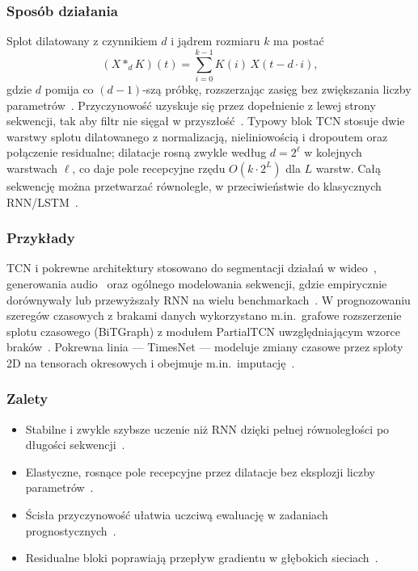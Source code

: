 \subsubsection{Sposób działania}
Splot dilatowany z czynnikiem $d$ i jądrem rozmiaru $k$ ma postać
\begin{equation}
  (X *_d K)(t) = \sum_{i=0}^{k-1} K(i)\, X(t - d\cdot i),
  \label{eq:dilated}
\end{equation}
gdzie $d$ pomija co $(d-1)$-szą próbkę, rozszerzając zasięg bez zwiększania liczby
parametrów~\citep{yu2016multi,oord2016wavenet}. Przyczynowość uzyskuje się przez
dopełnienie z lewej strony sekwencji, tak aby filtr nie sięgał w
przyszłość~\citep{bai2018empirical}. Typowy blok TCN stosuje dwie warstwy
splotu dilatowanego z normalizacją, nie\-li\-nio\-wo\-ścią i dropoutem oraz połączenie
residualne; dilatacje rosną zwykle według $d = 2^{\ell}$ w kolejnych warstwach
$\ell$, co daje pole recepcyjne rzędu $O(k\cdot 2^{L})$ dla $L$ warstw.
Całą sekwencję można przetwarzać równolegle, w przeciwieństwie do klasycznych
RNN/LSTM~\citep{bai2018empirical}.

\subsubsection{Przykłady}
TCN i pokrewne architektury stosowano do segmentacji działań w
wideo~\citep{lea2017temporal}, generowania audio~\citep{oord2016wavenet}
oraz ogólnego modelowania sekwencji, gdzie empirycznie dorównywały lub przewyższały
RNN na wielu benchmarkach~\citep{bai2018empirical}.
W prognozowaniu szeregów czasowych z brakami danych wykorzystano m.in.\ grafowe
rozszerzenie splotu czasowego (BiTGraph) z modułem PartialTCN uwzględniającym
wzorce braków~\citep{chen2024bitgraph}.
Pokrewna linia --- TimesNet --- modeluje zmiany czasowe przez sploty 2D na
tensorach okresowych i obejmuje m.in.\ imputację~\citep{wu2023timesnet}.

\subsubsection{Zalety}
\begin{itemize}
  \item Stabilne i zwykle szybsze uczenie niż RNN dzięki pełnej równoległości
        po długości sekwencji~\citep{bai2018empirical}.
  \item Elastyczne, rosnące pole recepcyjne przez dilatacje bez eksplozji
        liczby parametrów~\citep{yu2016multi,oord2016wavenet}.
  \item Ścisła przyczynowość ułatwia uczciwą ewaluację w zadaniach
        prognostycznych~\citep{bai2018empirical}.
  \item Residualne bloki poprawiają przepływ gradientu w głębokich
        sieciach~\citep{he2016deep,bai2018empirical}.
\end{itemize}

